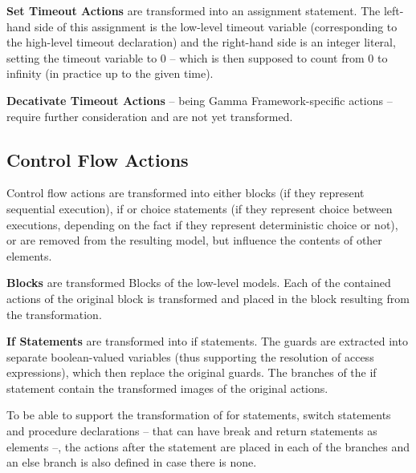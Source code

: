 \bigskip
\textbf{Set Timeout Actions} are transformed into an assignment statement. The left-hand side of this assignment is the low-level timeout variable (corresponding to the high-level timeout declaration) and the right-hand side is an integer literal, setting the timeout variable to 0 -- which is then supposed to count from 0 to infinity (in practice up to the given time).

\bigskip
\textbf{Decativate Timeout Actions} -- being Gamma Framework-specific actions -- require further consideration and are not yet transformed.

\subsection{Control Flow Actions}
Control flow actions are transformed into either blocks (if they represent sequential execution), if or choice statements (if they represent choice between executions, depending on the fact if they represent deterministic choice or not), or are removed from the resulting model, but influence the contents of other elements. 

\bigskip
\textbf{Blocks} are transformed Blocks of the low-level models. Each of the contained actions of the original block is transformed and placed in the block resulting from the transformation.

\bigskip
\textbf{If Statements} are transformed into if statements. The guards are extracted into separate boolean-valued variables (thus supporting the resolution of access expressions), which then replace the original guards. The branches of the if statement contain the transformed images of the original actions. 

To be able to support the transformation of for statements, switch statements and procedure declarations -- that can have break and return statements as elements --, the actions after the statement are placed in each of the branches and an else branch is also defined in case there is none.

